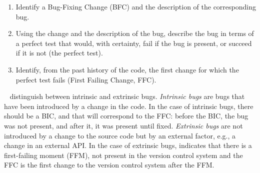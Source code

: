 \begin{enumerate}
    \item Identify a Bug-Fixing Change (BFC) and the description of the corresponding bug.
    \item Using the change and the description of the bug, describe the bug in terms of a perfect test that would, with certainty, fail if the bug is present, or succeed if it is not (the perfect test).
    \item Identify, from the past history of the code, the first change %
    for which the perfect test fails (First Failing Change, FFC).
\end{enumerate}

\gema~\cite{rodriguez2020bugs} distinguish between intrinsic and extrinsic bugs. 
\emph{Intrinsic bugs} are bugs that have been introduced by a change in the code.
In the case of intrinsic bugs, there should be a BIC, and that will correspond to the FFC: before the BIC, the bug was not present, and after it, it was present until fixed. 
\emph{Extrinsic bugs} are not introduced by a change to the source code but by an external factor, e.g., a change in an external API.
In the case of extrinsic bugs, \gema indicates that there is a first-failing moment (FFM), not present in the version control system and the FFC is the first change to the version control system after the FFM.

